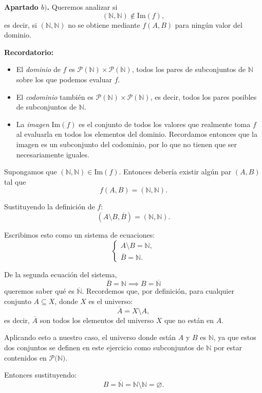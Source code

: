 \documentclass[a4paper,12pt]{article}
\begin{document}
\begin{ejercicioExamen}[title=Ejercicio 1]

\textbf{Apartado $b)$.} Queremos analizar si
\[
(\mathbb{N}, \mathbb{N}) \notin \mathrm{Im}(f),
\]
es decir, si \((\mathbb{N},\mathbb{N})\) no se obtiene mediante $f(A,B)$ para ningún valor del dominio.

\medskip
\textbf{Recordatorio:}
\begin{itemize}
    \item El \emph{dominio} de \(f\) es \(\mathcal{P}(\mathbb{N}) \times \mathcal{P}(\mathbb{N})\), todos los pares de subconjuntos de \(\mathbb{N}\) sobre los que podemos evaluar \(f\).  
    \item El \emph{codominio} también es \(\mathcal{P}(\mathbb{N}) \times \mathcal{P}(\mathbb{N})\), es decir, todos los pares posibles de subconjuntos de \(\mathbb{N}\).  
    \item La \emph{imagen} \(\mathrm{Im}(f)\) es el conjunto de todos los valores que realmente toma \(f\) al evaluarla en todos los elementos del dominio. Recordamos entonces que la imagen es un subconjunto del codominio, por lo que no tienen que ser necesariamente iguales.
\end{itemize}

\medskip
Supongamos que \((\mathbb{N}, \mathbb{N}) \in \mathrm{Im}(f)\). Entonces debería existir algún par \((A,B)\) tal que
\[
f(A,B) = (\mathbb{N}, \mathbb{N}).
\]

Sustituyendo la definición de \(f\):
\[
(A \setminus B, \overline{B}) = (\mathbb{N}, \mathbb{N}).
\]

Escribimos esto como un sistema de ecuaciones:
\[
\begin{cases}
A \setminus B = \mathbb{N},\\[2mm]
\overline{B} = \mathbb{N}.
\end{cases}
\]

De la segunda ecuación del sistema,
\[
\overline{B} = \mathbb{N} \implies B = \overline{\mathbb{N}}
\]
queremos saber qué es \(\overline{\mathbb{N}}\). Recordemos que, por definición, para cualquier conjunto \(A \subseteq X\), donde $X$ es el universo:
\[
\overline{A} = X \setminus A,
\]
es decir, \(\overline{A}\) son todos los elementos del universo $X$ que no están en \(A\).

\vspace{0.5em}

Aplicando esto a nuestro caso, el universo donde están $A$ y $B$ es $\mathbb{N}$, ya que estos dos conjuntos se definen en este ejercicio como subconjuntos de $\mathbb{N}$ por estar contenidos en $\mathcal{P}(\mathbb{N)}$.

\vspace{0.5em}

Entonces sustituyendo:
\[
B = \overline{\mathbb{N}} = \mathbb{N} \setminus \mathbb{N} = \varnothing.
\]

\end{ejercicioExamen}
\end{document}
